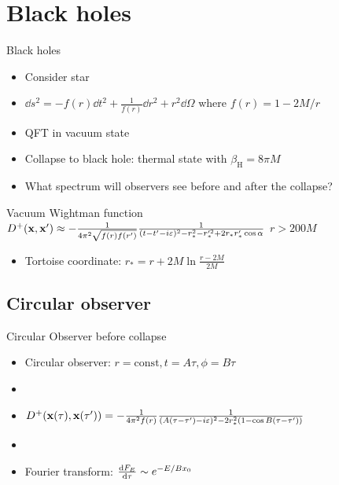 \documentclass{beamer}
\newcommand{\ind}[1]{_\mathrm{#1}}
\begin{document}
\section{Black holes}
\begin{frame}{Black holes}
\begin{itemize}
	\item Consider star
	\item \(\dd s^2 = -f(r)\dd{t^2} + \frac{1}{f(r)}\dd{r^2} + r^2 \dd{\Omega}\) where \(f(r) = 1 - 2M/r\)
	\item QFT in vacuum state
	\item Collapse to black hole: thermal state with \(\beta\ind{H} = 8\pi M\)\cite{hawking}
	\item What spectrum will observers see before and after the collapse?
\end{itemize}
\begin{block}{Vacuum Wightman function}
	\(D^+(\vb{x}, \vb{x}') \approx -\frac{1}{4\pi^2 \sqrt{f(r)f(r')}} \frac{1}{(t-t'-i\varepsilon)^2 - r_*^2 - r_*'^2 + 2r_*r_*' \cos{\alpha}}\) \hspace{1cm} \(r > 200M\)
\end{block}
\begin{itemize}
	\item Tortoise coordinate: \(r_* = r + 2M \ln \frac{r-2M}{2M}\)
\end{itemize}
\end{frame}


\subsection{Circular observer}

\begin{frame}{Circular Observer before collapse}
\begin{itemize}
	\item Circular observer: \(r = \mathrm{const}, t = A\tau, \phi = B \tau\)
	\item[]
	\item \(D^+(\vb{x}(\tau), \vb{x}(\tau')) = -\frac{1}{4\pi^2f(r)} \frac{1}{(A(\tau-\tau')-i\varepsilon)^2 - 2r_*^2 (1 - \cos{B(\tau-\tau')})}\)
	\item[]
	\item Fourier transform: \(\dv{F_E}{\tau} \sim e^{-E/B x_0}\)
\end{itemize}
\end{frame}
\end{document}

